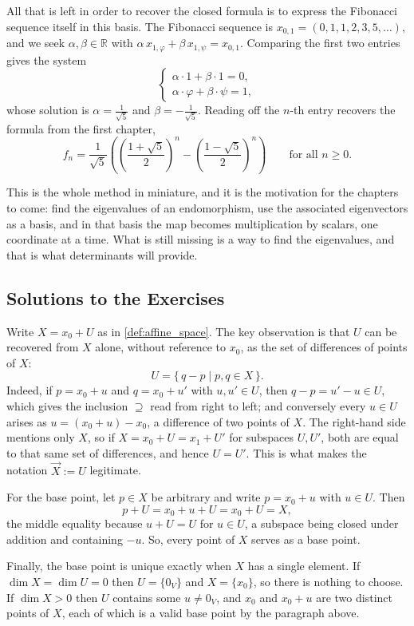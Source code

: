 All that is left in order to recover the closed formula is to express the Fibonacci sequence itself in this basis. The Fibonacci sequence is $x_{0,1} = (0, 1, 1, 2, 3, 5, \dots)$, and we seek $\alpha, \beta \in \mathbb{R}$ with $\alpha \, x_{1,\varphi} + \beta \, x_{1,\psi} = x_{0,1}$. Comparing the first two entries gives the system
\[
\begin{cases}
\alpha \cdot 1 + \beta \cdot 1 = 0, \\
\alpha \cdot \varphi + \beta \cdot \psi = 1,
\end{cases}
\]
whose solution is $\alpha = \frac{1}{\sqrt{5}}$ and $\beta = -\frac{1}{\sqrt{5}}$. Reading off the $n$-th entry recovers the formula from the first chapter,
\[
f_n = \frac{1}{\sqrt{5}} \left( \left( \frac{1 + \sqrt{5}}{2} \right)^{\! n} - \left( \frac{1 - \sqrt{5}}{2} \right)^{\! n} \right) \qquad \text{for all } n \ge 0.
\]

This is the whole method in miniature, and it is the motivation for the chapters to come: find the eigenvalues of an endomorphism, use the associated eigenvectors as a basis, and in that basis the map becomes multiplication by scalars, one coordinate at a time. What is still missing is a way to find the eigenvalues, and that is what determinants will provide.

\subsection{Solutions to the Exercises}
\label{sec:solutions_misc}

\begin{exercisesolution}
\label{sol:direction_space_unique}
Write $X = x_0 + U$ as in \cref{def:affine_space}. The key observation is that $U$ can be recovered from $X$ alone, without reference to $x_0$, as the set of differences of points of $X$:
\[
U = \{\, q - p \mid p, q \in X \,\}.
\]
Indeed, if $p = x_0 + u$ and $q = x_0 + u'$ with $u, u' \in U$, then $q - p = u' - u \in U$, which gives the inclusion $\supseteq$ read from right to left; and conversely every $u \in U$ arises as $u = (x_0 + u) - x_0$, a difference of two points of $X$. The right-hand side mentions only $X$, so if $X = x_0 + U = x_1 + U'$ for subspaces $U, U'$, both are equal to that same set of differences, and hence $U = U'$. This is what makes the notation $\vec{X} := U$ legitimate.

For the base point, let $p \in X$ be arbitrary and write $p = x_0 + u$ with $u \in U$. Then
\[
p + U = x_0 + u + U = x_0 + U = X,
\]
the middle equality because $u + U = U$ for $u \in U$, a subspace being closed under addition and containing $-u$. So, every point of $X$ serves as a base point.

Finally, the base point is unique exactly when $X$ has a single element. If $\dim X = \dim U = 0$ then $U = \{0_V\}$ and $X = \{x_0\}$, so there is nothing to choose. If $\dim X > 0$ then $U$ contains some $u \neq 0_V$, and $x_0$ and $x_0 + u$ are two distinct points of $X$, each of which is a valid base point by the paragraph above.
\end{exercisesolution}

